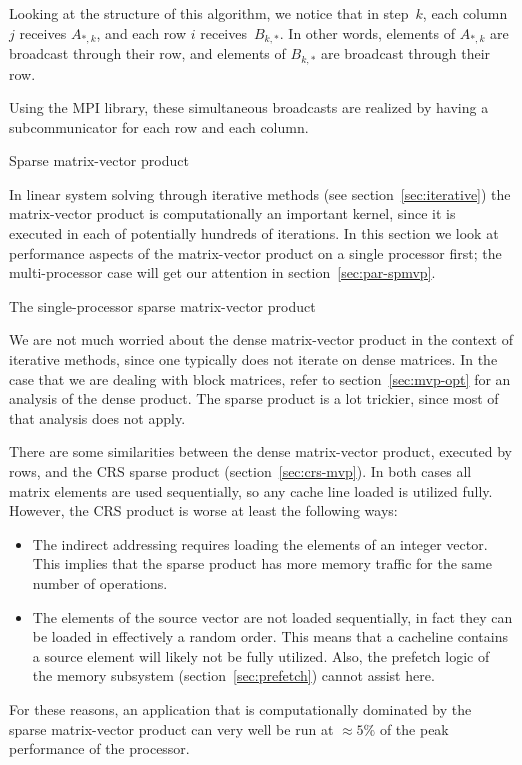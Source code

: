 Looking at the structure of this algorithm, we notice that in
step~$k$, each column $j$ receives $A_{*,k}$, and each row $i$
receives~$B_{k,*}$. In other words, elements of $A_{*,k}$ are
broadcast through their row, and elements of $B_{k,*}$ are broadcast
through their row.

Using the MPI library, these simultaneous broadcasts are realized by
having a subcommunicator for each row and each column.


 {Sparse matrix-vector product}
\label{sec:pspmvp}

In linear system solving through iterative methods (see
section~\ref{sec:iterative}) the matrix-vector product is
computationally an important kernel, since it is executed in each of
potentially hundreds of iterations. In this section we look at
performance aspects of the matrix-vector product on a single
processor first; the multi-processor case will get our attention in
section~\ref{sec:par-spmvp}.

 {The single-processor sparse matrix-vector product}
\label{sec:spmvp-performance}

We are not much worried about the dense matrix-vector product in the
context of iterative methods, since one typically does not iterate on
dense matrices. In the case that we are dealing with block matrices,
refer to section~\ref{sec:mvp-opt} for an analysis of the dense
product. The sparse product is a lot trickier, since most of that
analysis does not apply.


There are some similarities between the dense matrix-vector product,
executed by rows, and the \ac{CRS} sparse product
(section~\ref{sec:crs-mvp}). In both cases all matrix elements are
used sequentially, so any cache line loaded is utilized
fully. However, the \ac{CRS} product is worse at least the following
ways:
\begin{itemize}
\item The indirect addressing requires loading the elements of an
  integer vector. This implies that the sparse product has more memory
  traffic for the same number of operations.
\item The elements of the source vector are not loaded sequentially,
  in fact they can be loaded in effectively a random order. This means
  that a cacheline contains a source element will likely not be fully
  utilized. Also, the prefetch logic of the memory subsystem
  (section~\ref{sec:prefetch}) cannot assist here.
\end{itemize}
For these reasons, an application that is computationally dominated by
the sparse matrix-vector product can very well be run at $\approx5\%$
of the peak performance of the processor.

